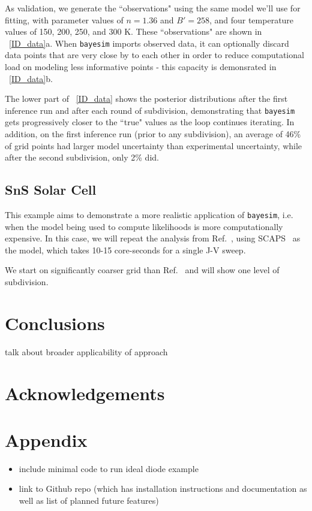\documentclass[aps,prl,amsmath,amssymb,superscriptaddress,notitlepage,groupedaddress]{revtex4-1}
\begin{document}
    As validation, we generate the ``observations" using the same model we'll use for fitting, with parameter values of $n=1.36$ and $B'=258$, and four temperature values of 150, 200, 250, and 300 K. These ``observations" are shown in ~\autoref{ID_data}a. When \texttt{bayesim} imports observed data, it can optionally discard data points that are very close by to each other in order to reduce computational load on modeling less informative points - this capacity is demonsrated in ~\autoref{ID_data}b.


    The lower part of ~\autoref{ID_data} shows the posterior distributions after the first inference run and after each round of subdivision, demonstrating that \texttt{bayesim} gets progressively closer to the ``true" values as the loop continues iterating. In addition, on the first inference run (prior to any subdivision), an average of 46\% of grid points had larger model uncertainty than experimental uncertainty, while after the second subdivision, only 2\% did.

  \subsection{SnS Solar Cell}
    This example aims to demonstrate a more realistic application of \texttt{bayesim}, i.e. when the model being used to compute likelihoods is more computationally expensive. In this case, we will repeat the analysis from Ref.~\cite{SnSJoule}, using SCAPS~\cite{SCAPS} as the model, which takes 10-15 core-seconds for a single J-V sweep.

    We start on significantly coarser grid than Ref.~\cite{SnSJoule} and will show one level of subdivision.


\section*{Conclusions}
 talk about broader applicability of approach

\section*{Acknowledgements}

\section*{Appendix}
 \begin{itemize}
   \item include minimal code to run ideal diode example
   \item link to Github repo (which has installation instructions and documentation as well as list of planned future features)
  \end{itemize}



\end{document}
